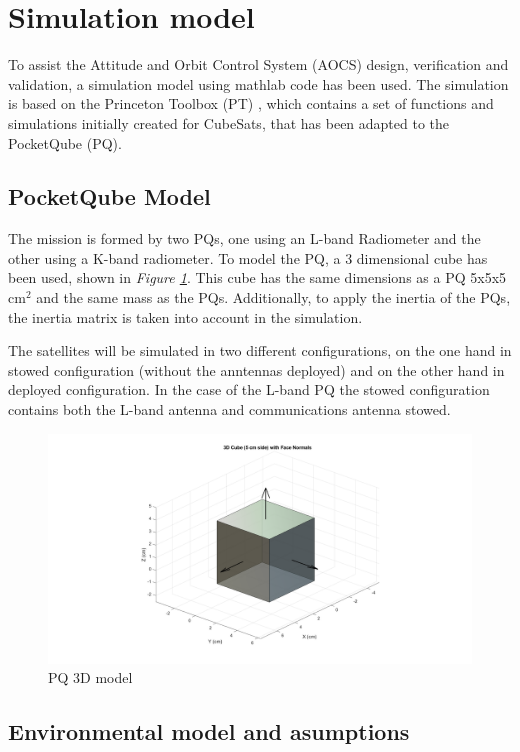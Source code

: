 
\section{Simulation model}
To assist the Attitude and Orbit Control System (AOCS) design, verification and validation, a simulation model using mathlab code has been used. The
simulation is based on the Princeton Toolbox (PT) \cite{PrincetonToolbox}, which contains a set of functions and 
simulations initially created for CubeSats, that has been adapted to the PocketQube (PQ).

\subsection{PocketQube Model}
The mission is formed by two PQs, one using an L-band Radiometer and the other using a K-band radiometer. To model the PQ, a 3 dimensional cube has
been used, shown in \textit{Figure \ref{fig:PQmodel}}. This cube has the same dimensions as a PQ 5x5x5 cm$^2$ and the same mass as the PQs. Additionally, to apply the inertia of the PQs, the 
inertia matrix is taken into account in the simulation.\vspace{0.2em}

\noindent The satellites will be simulated in two different configurations, on the one hand in stowed configuration (without the anntennas deployed) and on the other
hand in deployed configuration. In the case of the L-band PQ the stowed configuration contains both the L-band antenna and communications antenna
stowed.
    \begin{figure}[H]
        \centering
        \includegraphics[width=0.8\linewidth]{res/img/3_simulation_performance/PQ model.png}
        \caption{PQ 3D model}
        \label{fig:PQmodel}
    \end{figure}

\subsection{Environmental model and asumptions}

